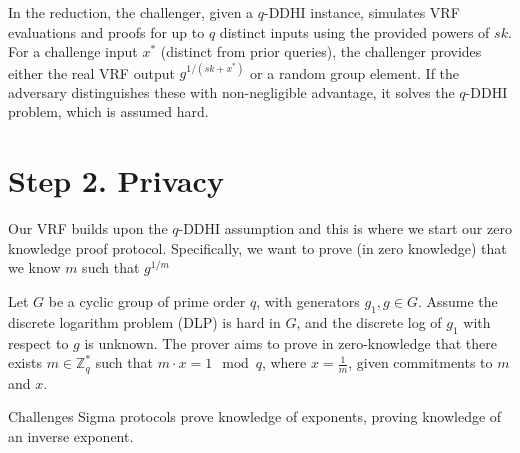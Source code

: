 In the reduction, the challenger, given a $q$-DDHI instance, simulates VRF evaluations and proofs for up to $q$ distinct inputs using the provided powers of $sk$. For a challenge input $x^*$ (distinct from prior queries), the challenger provides either the real VRF output $g^{1/(sk+x^*)}$ or a random group element. If the adversary distinguishes these with non-negligible advantage, it solves the $q$-DDHI problem, which is assumed hard.





















\section{Step 2. Privacy}
Our VRF builds upon the $q$-DDHI assumption and this is where we start our zero knowledge proof protocol. Specifically, we want to prove (in zero knowledge) that we know $m$ such that $g^{1/m}$ 

Let $G$ be a cyclic group of prime order $q$, with generators $g_1, g \in G$. Assume the discrete logarithm problem (DLP) is hard in $G$, and the discrete log of $g_1$ with respect to $g$ is unknown.
The prover aims to prove in zero-knowledge that there exists $m \in \mathbb{Z}_q^*$ such that $m \cdot x = 1 \mod q$, where $x = \frac{1}{m}$, given commitments to $m$ and $x$.

Challenges
Sigma protocols prove knowledge of exponents, proving knowledge of an inverse exponent. 

